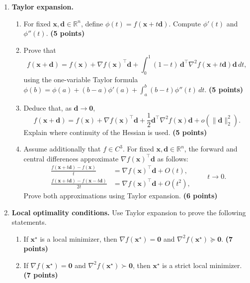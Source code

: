\documentclass[10pt,a4paper]{article}
\begin{document}
\begin{enumerate}
    \item \textbf{Taylor expansion.}
    \begin{enumerate}
        \item
        For fixed $\mathbf{x},\mathbf{d}\in\mathbb{R}^n$,
        define $\phi(t)=f(\mathbf{x}+t\mathbf{d})$.
        Compute $\phi'(t)$ and $\phi''(t)$.
        \textbf{(5 points)}

        \item
        Prove that
        \[
            f(\mathbf{x}+\mathbf{d})
            =
            f(\mathbf{x})+\nabla f(\mathbf{x})^\top\mathbf{d}
            +\int_0^1(1-t)\,
            \mathbf{d}^\top\nabla^2 f(\mathbf{x}+t\mathbf{d})
            \mathbf{d}\,dt,
        \]
        using the one-variable Taylor formula
        $\phi(b)=\phi(a)+(b-a)\phi'(a)
        +\int_a^b(b-t)\phi''(t)\,dt$.
        \textbf{(5 points)}

        \item
        Deduce that, as $\mathbf{d}\to\mathbf{0}$,
        \[
            f(\mathbf{x}+\mathbf{d})
            =
            f(\mathbf{x})+\nabla f(\mathbf{x})^\top\mathbf{d}
            +\frac12\mathbf{d}^\top\nabla^2 f(\mathbf{x})\mathbf{d}
            +o(\|\mathbf{d}\|_2^2).
        \]
        Explain where continuity of the Hessian is used.
        \textbf{(5 points)}

        \item
        Assume additionally that $f\in C^3$.
        For fixed $\mathbf{x},\mathbf{d}\in\mathbb{R}^n$,
        the forward and central differences approximate
        $\nabla f(\mathbf{x})^\top\mathbf{d}$ as follows:
        \[
            \begin{aligned}
                \frac{f(\mathbf{x}+t\mathbf{d})-f(\mathbf{x})}{t}
                &=
                \nabla f(\mathbf{x})^\top\mathbf{d}+O(t),\\
                \frac{f(\mathbf{x}+t\mathbf{d})
                -f(\mathbf{x}-t\mathbf{d})}{2t}
                &=
                \nabla f(\mathbf{x})^\top\mathbf{d}+O(t^2),
            \end{aligned}
            \qquad t\to0.
        \]
        Prove both approximations using Taylor expansion.
        \textbf{(6 points)}
    \end{enumerate}

    \item \textbf{Local optimality conditions.}
    Use Taylor expansion to prove the following statements.
    \begin{enumerate}
        \item
        If $\mathbf{x}^\star$ is a local minimizer, then
        $\nabla f(\mathbf{x}^\star)=\mathbf{0}$ and
        $\nabla^2 f(\mathbf{x}^\star)\succeq\mathbf{0}$.
        \textbf{(7 points)}

        \item
        If $\nabla f(\mathbf{x}^\star)=\mathbf{0}$ and
        $\nabla^2 f(\mathbf{x}^\star)\succ\mathbf{0}$,
        then $\mathbf{x}^\star$ is a strict local minimizer.
        \textbf{(7 points)}
    \end{enumerate}
\end{enumerate}
\end{document}
